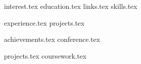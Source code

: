 \documentclass[]{deedy-resume-openfont}
\newcommand*{\pgonecolone}{pg_1_column_1/}
\newcommand*{\pgonecoltwo}{pg_1_column_2/}
\newcommand*{\pgtwocolone}{pg_2_column_1/}
\newcommand*{\pgtwocoltwo}{pg_2_column_2/}
\begin{document}
%
%


%
%



%
%

\begin{minipage}[t]{0.33\textwidth} 

{interest.tex}
{education.tex}
{links.tex}
{skills.tex}


%
%

\end{minipage} 
\hfill
\begin{minipage}[t]{0.66\textwidth} 

{experience.tex}
{projects.tex}

\end{minipage} 


%
%

\begin{minipage}[t]{0.33\textwidth} 

{achievements.tex}
{conference.tex}


%
%

\end{minipage} 
\hfill
\begin{minipage}[t]{0.66\textwidth} 

{projects.tex}
{coursework.tex}

\end{minipage} 
\end{document}
